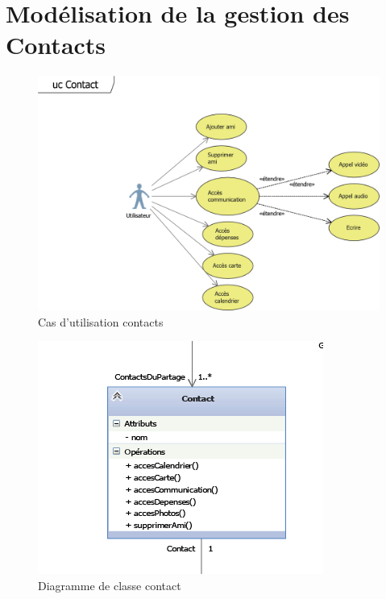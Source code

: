 \documentclass[11pt]{article}
\begin{document}
\section{Modélisation de la gestion des Contacts}
\begin{figure}[!h]
        \centering \includegraphics[scale=1]{ucContact.png}
        \caption{Cas d'utilisation contacts}
         \label{fig:ucContact}
\end{figure}
\begin{figure}[!h]
        \centering \includegraphics[scale=1]{contact.png}
        \caption{Diagramme de classe contact}
         \label{fig:contact}
\end{figure}

\newpage
\end{document}
